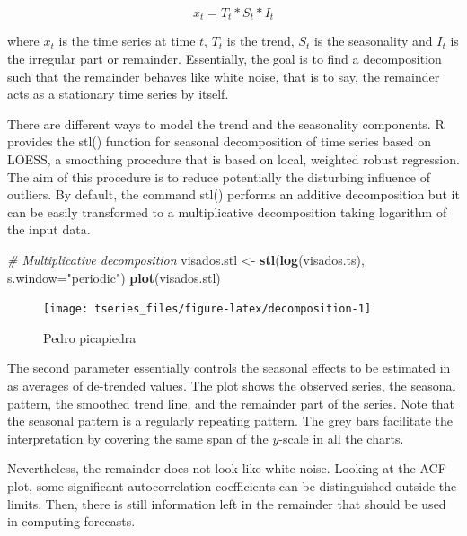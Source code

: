 \documentclass[]{article}
\newenvironment{Shaded}{\begin{snugshade}}{\end{snugshade}}
\newcommand{\KeywordTok}[1]{\textcolor[rgb]{0.13,0.29,0.53}{\textbf{{#1}}}}
\newcommand{\DataTypeTok}[1]{\textcolor[rgb]{0.13,0.29,0.53}{{#1}}}
\newcommand{\StringTok}[1]{\textcolor[rgb]{0.31,0.60,0.02}{{#1}}}
\newcommand{\CommentTok}[1]{\textcolor[rgb]{0.56,0.35,0.01}{\textit{{#1}}}}
\newcommand{\NormalTok}[1]{{#1}}
\begin{document}
\[x_t = T_t * S_t * I_t\]

where \(x_t\) is the time series at time \(t\), \(T_t\) is the trend,
\(S_t\) is the seasonality and \(I_t\) is the irregular part or
remainder. Essentially, the goal is to find a decomposition such that
the remainder behaves like white noise, that is to say, the remainder
acts as a stationary time series by itself.

There are different ways to model the trend and the seasonality
components. R provides the stl() function for seasonal decomposition of
time series based on LOESS, a smoothing procedure that is based on
local, weighted robust regression. The aim of this procedure is to
reduce potentially the disturbing influence of outliers. By default, the
command stl() performs an additive decomposition but it can be easily
transformed to a multiplicative decomposition taking logarithm of the
input data.

\begin{Shaded}
\begin{Highlighting}[]
\CommentTok{# Multiplicative decomposition}
\NormalTok{visados.stl <-}\StringTok{ }\KeywordTok{stl}\NormalTok{(}\KeywordTok{log}\NormalTok{(visados.ts), }\DataTypeTok{s.window=}\StringTok{"periodic"}\NormalTok{)}
\KeywordTok{plot}\NormalTok{(visados.stl)}
\end{Highlighting}
\end{Shaded}

\begin{figure}[H]

{\centering \texttt{[image: tseries\_files/figure-latex/decomposition-1]} 

}

\caption{Pedro picapiedra}\label{fig:decomposition}
\end{figure}

The second parameter essentially controls the seasonal effects to be
estimated in as averages of de-trended values. The plot shows the
observed series, the seasonal pattern, the smoothed trend line, and the
remainder part of the series. Note that the seasonal pattern is a
regularly repeating pattern. The grey bars facilitate the interpretation
by covering the same span of the \(y\)-scale in all the charts.

Nevertheless, the remainder does not look like white noise. Looking at
the ACF plot, some significant autocorrelation coefficients can be
distinguished outside the limits. Then, there is still information left
in the remainder that should be used in computing forecasts.
\end{document}
